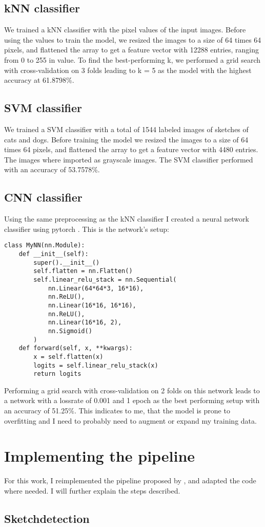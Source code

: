 \subsection*{kNN classifier}
We trained a kNN classifier with the pixel values of the input images. Before
using the values to train the model, we resized the images to a size of 64 times 
64 pixels, and flattened the array to get a feature vector with 12288 entries, 
ranging from 0 to 255 in value. To find the best-performing k, we performed a
grid search with cross-validation on 3 folds leading to k = 5 as the model with 
the highest accuracy at 61.8798\%.

\subsection*{SVM classifier}
We trained a SVM classifier with a total of 1544 labeled images of sketches of
cats and dogs. Before training the model we resized the images to a size of 64
times 64 pixels, and flattened the array to get a feature vector with 4480
entries. The images where imported as grayscale images. The SVM classifier
performed with an accuracy of 53.7578\%.


\subsection*{CNN classifier}
Using the same preprocessing as the kNN classifier I created a neural network
classifier using pytorch \textcite{pytorch}. This is the network's setup:

\begin{lstlisting}
class MyNN(nn.Module):
    def __init__(self):
        super().__init__()
        self.flatten = nn.Flatten()
        self.linear_relu_stack = nn.Sequential(
            nn.Linear(64*64*3, 16*16),
            nn.ReLU(),
            nn.Linear(16*16, 16*16),
            nn.ReLU(),
            nn.Linear(16*16, 2),
            nn.Sigmoid()
        )
    def forward(self, x, **kwargs):
        x = self.flatten(x)
        logits = self.linear_relu_stack(x)
        return logits
\end{lstlisting}

Performing a grid search with cross-validation on 2 folds on this network leads
to a network with a lossrate of 0.001 and 1 epoch as the best performing setup
with an accuracy of 51.25\%. This indicates to me, that the model is prone to
overfitting and I need to probably need to augment or expand my training data.

\section*{Implementing the pipeline}
For this work, I reimplemented the pipeline proposed by
\textcite{korpitsch-2023-sao}, and adapted the code where needed. I will further
explain the steps described.

\subsection*{Sketchdetection}